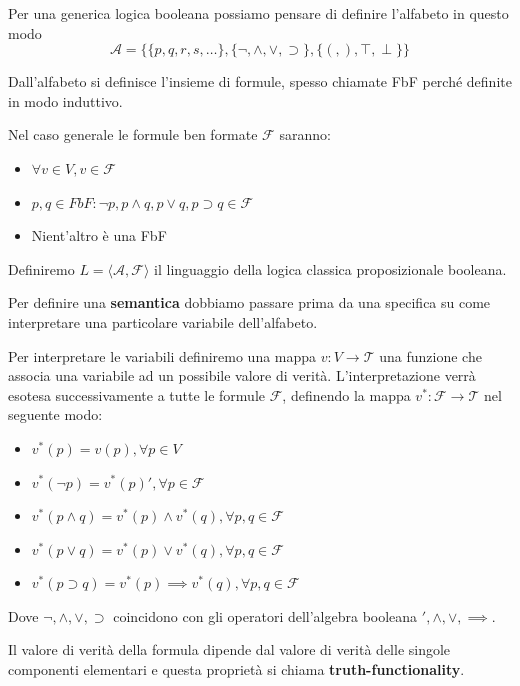Per una generica logica booleana possiamo pensare di definire l'alfabeto in questo modo
$$\mathcal{A} = \{\{p,q,r,s,\dots\}, \{\lnot, \land, \lor, \supset \}, \{(,),\top, \perp\}\}$$

Dall'alfabeto si definisce l'insieme di formule, spesso chiamate FbF perché definite 
in modo induttivo.

Nel caso generale le formule ben formate $\mathcal{F}$ saranno:
\begin{itemize}
    \item $\forall v\in V, v\in \mathcal{F}$
    \item $p,q\in FbF: \lnot p, p\land q, p\lor q, p \supset q\in \mathcal{F}$
    \item Nient'altro è una FbF
\end{itemize}

Definiremo $L= \langle \mathcal{A},\mathcal{F}\rangle$ il linguaggio della logica classica 
proposizionale booleana.

Per definire una \textbf{semantica} dobbiamo passare prima da una specifica 
su come interpretare una particolare variabile dell'alfabeto.

Per interpretare le variabili definiremo una mappa $v:V\to \mathcal{T}$ una funzione 
che associa una variabile ad un possibile valore di verità. L'interpretazione
verrà esotesa successivamente a tutte le formule $\mathcal{F}$, definendo la mappa 
$v^\ast:\mathcal{F}\to \mathcal{T}$ nel seguente modo:
\begin{itemize}
    \item $v^\ast(p) = v(p), \forall p\in V$
    \item $v^\ast(\lnot p) = v^\ast(p)', \forall p\in \mathcal{F}$
    \item $v^\ast(p\land q) = v^\ast(p) \land v^\ast(q), \forall p,q\in \mathcal{F}$
    \item $v^\ast(p\lor q) = v^\ast(p) \lor v^\ast(q), \forall p,q\in \mathcal{F}$
    \item $v^\ast(p\supset q) = v^\ast(p) \implies v^\ast(q), \forall p,q\in \mathcal{F}$
\end{itemize}

Dove $\lnot, \land, \lor, \supset$ coincidono con gli operatori dell'algebra booleana
$', \land, \lor, \implies$.

\begin{nota}
    Il valore di verità della formula dipende dal valore di verità delle singole componenti
    elementari e questa proprietà si chiama \textbf{truth-functionality}.
\end{nota}

